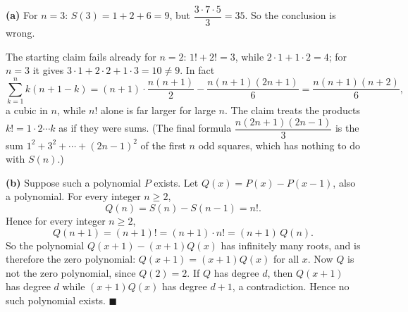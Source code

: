 \textbf{(a)} For $n=3$: $S(3)=1+2+6=9$, but $\dfrac{3\cdot7\cdot5}{3}=35$. So the conclusion is wrong.

The starting claim fails already for $n=2$: $1!+2!=3$, while $2\cdot1+1\cdot2=4$; for $n=3$ it gives $3\cdot1+2\cdot2+1\cdot3=10\ne9$. In fact
\[\sum_{k=1}^{n}k(n+1-k)=(n+1)\cdot\dfrac{n(n+1)}{2}-\dfrac{n(n+1)(2n+1)}{6}=\dfrac{n(n+1)(n+2)}{6},\]
a cubic in $n$, while $n!$ alone is far larger for large $n$. The claim treats the products $k!=1\cdot2\cdots k$ as if they were sums. (The final formula $\dfrac{n(2n+1)(2n-1)}{3}$ is the sum $1^2+3^2+\cdots+(2n-1)^2$ of the first $n$ odd squares, which has nothing to do with $S(n)$.)

\textbf{(b)} Suppose such a polynomial $P$ exists. Let $Q(x)=P(x)-P(x-1)$, also a polynomial. For every integer $n\ge2$,
\[Q(n)=S(n)-S(n-1)=n!.\]
Hence for every integer $n\ge2$,
\[Q(n+1)=(n+1)!=(n+1)\cdot n!=(n+1)\,Q(n).\]
So the polynomial $Q(x+1)-(x+1)Q(x)$ has infinitely many roots, and is therefore the zero polynomial: $Q(x+1)=(x+1)Q(x)$ for all $x$. Now $Q$ is not the zero polynomial, since $Q(2)=2$. If $Q$ has degree $d$, then $Q(x+1)$ has degree $d$ while $(x+1)Q(x)$ has degree $d+1$, a contradiction. Hence no such polynomial exists. $\blacksquare$
